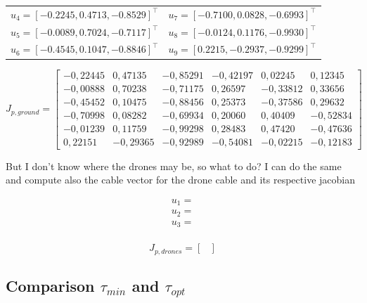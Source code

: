 \begin{table}[h]
    \centering
\begin{tabular}{cc}
 $u_4 =[-0.2245,	0.4713,	-0.8529]^\top $       & $u_7 = [-0.7100,	0.0828,	-0.6993]^\top $   \\
 $u_5 =[-0.0089,	0.7024,	-0.7117]^\top $ & $u_8 = [-0.0124,	0.1176,	-0.9930]^\top $   \\
 $u_6 =[-0.4545,	0.1047,	-0.8846]^\top $  & $u_9 = [0.2215,	   -0.2937,	-0.9299]^\top $   \\ 

\end{tabular}
\end{table}

\[
J_{p, ground} = 
\begin{bmatrix}
-0,22445 & 0,47135 & -0,85291 & -0,42197 & 0,02245 & 0,12345 \\
-0,00888 & 0,70238 & -0,71175 & 0,26597 & -0,33812 & 0,33656 \\
-0,45452 & 0,10475 & -0,88456 & 0,25373 & -0,37586 & 0,29632 \\
-0,70998 & 0,08282 & -0,69934 & 0,20060 & 0,40409 & -0,52834 \\
-0,01239 & 0,11759 & -0,99298 & 0,28483 & 0,47420 & -0,47636 \\
0,22151 & -0,29365 & -0,92989 & -0,54081 & -0,02215 & -0,12183
\end{bmatrix}
\]

But I don't know where the drones may be, so what to do? 
I can do the same and compute also the cable vector for the drone cable and its respective jacobian

\[
\begin{aligned}
    u_1 = \\
    u_2 = \\
    u_3 = \\
\end{aligned}
\]

\[
J_{p, drones} = 
\begin{bmatrix}

\end{bmatrix}
\]






\subsection{Comparison $\tau_{min}$ and $\tau_{opt}$}

